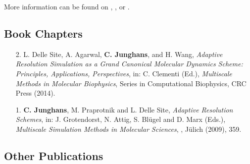 \documentclass{article}
\begin{document}
More information can be found on , ,  or .

\subsection*{Book Chapters}

\begin{enumerate}
\item[2.] L. Delle Site, A. Agarwal, \textbf{C. Junghans}, and H. Wang, 
  \textit{Adaptive Resolution Simulation as a Grand Canonical Molecular Dynamics Scheme: Principles, Applications, Perspectives},
  in: C. Clementi (Ed.),
  \textit{Multiscale Methods in Molecular Biophysics},
  Series in Computational Biophysics, CRC Press (2014).

\item[1.] \textbf{C. Junghans}, M. Praprotnik and L. Delle Site,
  \textit{Adaptive Resolution Schemes},
  in: J. Grotendorst, N. Attig, S. Bl{\"u}gel and D. Marx (Eds.),
  \textit{Multiscale Simulation Methods in Molecular Sciences}, , J{\"u}lich (2009), 359.
\end{enumerate}

\subsection*{Other Publications}
\end{document}
